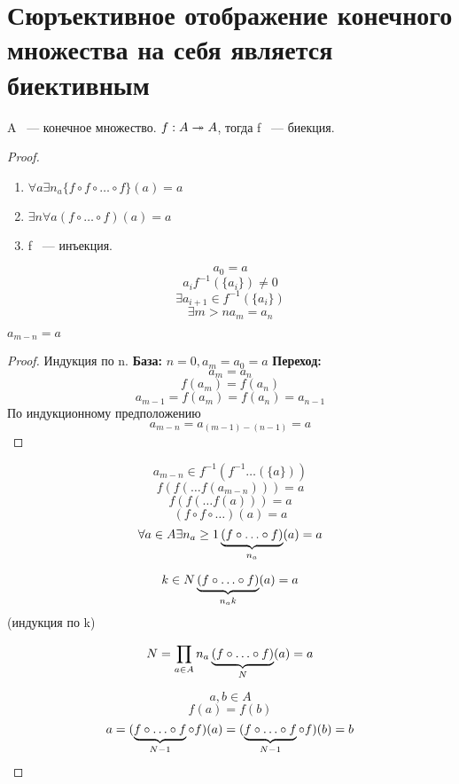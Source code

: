 ﻿\section{Сюръективное отображение конечного множества на себя является биективным}

\begin{theorem}{}
    A ~--- конечное множество. 
    $f: A \twoheadrightarrow A$, тогда f ~--- биекция.
\end{theorem}

\begin{proof}
    \begin{enumerate}
        \item $\forall a \exists n_a \{f \circ f \circ \ldots \circ f\}(a) = a$
        \item $\exists n \forall a (f \circ \ldots \circ f)(a)  = a$
        \item f ~--- инъекция.
    \end{enumerate}
    $$a_0 = a$$
    $$a_i f^{-1}(\{a_i\}) \ne 0$$
    $$\exists a_{i + 1} \in f^{-1}(\{a_i\})$$
    $$\exists m > n a_m = a_n$$
    \begin{lemma}{}
        $a_{m - n} = a$   
    \end{lemma}
    \begin{proof}
        Индукция по n.
        {\bf База:} $n = 0,  a_m = a_0 = a$
        {\bf Переход:} $$a_m = a_n$$
        $$f(a_m) = f(a_n)$$
        $$a_{m - 1} = f(a_m) = f(a_n) = a_{n - 1}$$
        По индукционному предположению 
        $$a_{m - n} = a_{(m - 1) - (n - 1)} = a$$
    \end{proof}
    $$a_{m - n} \in  f^{-1}(f^{-1}\ldots(\{a\}))$$
    $$f(f(\ldots f(a_{m - n}))) = a$$
    $$f(f(\ldots f(a))) = a$$
    $$(f \circ f \circ \ldots)(a) = a$$
    $$\forall a \in A \exists n_a \ge 1 \underbrace{(f \circ \ldots \circ f)}_{n_a}(a) = a$$
   
    $$k \in N \underbrace{(f \circ \ldots \circ f)}_{n_a k}(a) = a$$
    (индукция по k)
    
    $$N = \prod_{a \in A} n_a  \underbrace{(f \circ \ldots \circ f)}_{N}(a) = a$$
    
    $$a, b \in A$$
    $$f(a) = f(b)$$
    $$a = (\underbrace{f \circ \ldots \circ f}_{N - 1} \circ f)(a) = (\underbrace{f \circ \ldots \circ f}_{N - 1} \circ f)(b) = b$$
\end{proof}